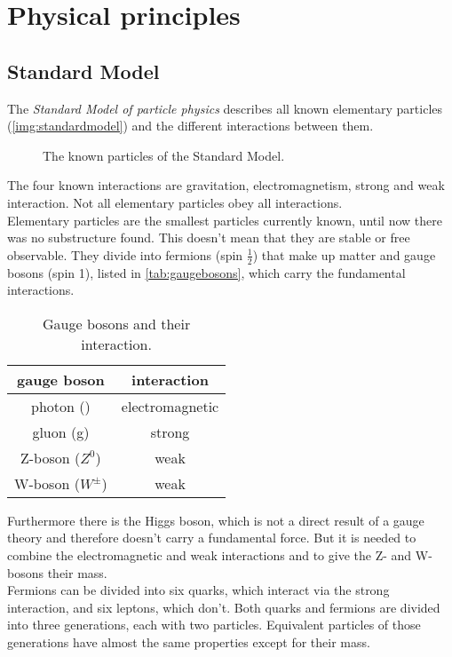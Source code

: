 \section{Physical principles}
\subsection{Standard Model}
The \emph{Standard Model of particle physics} describes all known elementary particles (\autoref{img:standardmodel}) and the different 
interactions between them.
\begin{figure}[H]
        \centering
        \def\svgwidth{0.55\textwidth}
       
        \caption{The known particles of the Standard Model.}
        \label{img:standardmodel}
\end{figure}
The four known interactions are gravitation, electromagnetism, strong and weak interaction. Not all elementary particles obey all interactions.\\
Elementary particles are the smallest particles currently known, until now there was no substructure found. 
This doesn't mean that they are stable or free observable. They divide into fermions (spin $\frac{1}{2}$) that make up matter and 
gauge bosons (spin 1), listed in \autoref{tab:gaugebosons}, which carry the fundamental interactions. 
\begin{table}[htb]
\caption{Gauge bosons and their interaction.}
\begin{center}
\begin{tabular}{|c|c|}
	\hline
	gauge boson 		& interaction			\\ \hline \hline
	photon (\textgamma) & electromagnetic 		\\ \hline
	gluon (g) 			& strong				\\ \hline
	Z-boson ($Z^0$)		& weak					\\ \hline
	W-boson ($W^\pm$)	& weak					\\ \hline
\end{tabular}
\end{center}
\label{tab:gaugebosons}
\end{table}
Furthermore there is the Higgs boson, which is not a direct result of a gauge theory and 
therefore doesn't carry a fundamental force. But it is needed to combine the electromagnetic and weak interactions and to give the Z- and W-bosons
their mass. \\
Fermions can be divided into six quarks, which interact via the strong interaction, and six leptons, which don't. Both quarks and fermions are 
divided into three generations, each with two particles. Equivalent particles of those generations have almost the same properties except for 
their mass.
